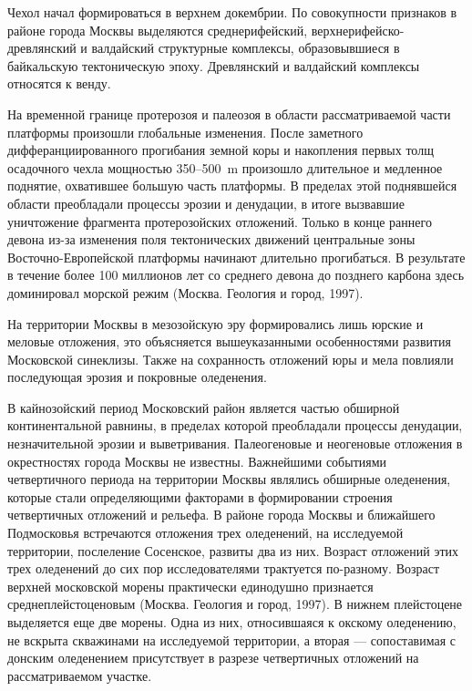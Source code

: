 Чехол начал формироваться в верхнем докембрии. По совокупности 
признаков в районе города Москвы выделяются среднерифейский, верхнерифейско-древлянский 
и валдайский структурные комплексы, образовывшиеся в байкальскую тектоническую эпоху. 
Древлянский и валдайский комплексы относятся к венду.

На временной границе протерозоя и палеозоя в области рассматриваемой части платформы 
произошли глобальные изменения. После заметного 
дифферанциированного прогибания земной коры и накопления первых толщ осадочного чехла
мощностью 350--500~\si{\meter} произошло длительное и медленное поднятие, охватившее
большую часть платформы. В пределах этой поднявшейся области преобладали процессы 
эрозии и денудации, в итоге вызвавшие уничтожение фрагмента протерозойских отложений. 
Только в конце раннего девона из-за изменения поля тектонических движений центральные 
зоны Восточно-Европейской платформы
начинают длительно прогибаться.
В результате в течение более 100 миллионов лет 
со среднего девона до позднего карбона здесь доминировал морской режим (Москва. Геология и город, 1997).

На территории Москвы в мезозойскую эру формировались лишь юрские и меловые отложения, это объясняется 
вышеуказанными особенностями развития Московской синеклизы. Также на сохранность 
отложений юры и мела повлияли последующая эрозия и покровные оледенения.

В кайнозойский период Московский район является частью обширной континентальной равнины,
в пределах которой преобладали процессы денудации, незначительной эрозии и выветривания.
Палеогеновые и неогеновые отложения в окрестностях города Москвы не известны.
Важнейшими событиями четвертичного периода на территории Москвы являлись обширные оледенения, 
которые стали определяющими факторами в формировании 
строения четвертичных отложений и рельефа.
В районе города Москвы и ближайшего Подмосковья встречаются отложения трех оледенений, 
на исследуемой территории,
послеление Сосенское, развиты два из них. 
Возраст отложений этих трех оледенений до сих пор исследователями трактуется по-разному.
Возраст верхней московской морены практически единодушно признается 
среднеплейстоценовым (Москва. Геология и город, 1997). 
В нижнем плейстоцене выделяется еще две морены.
Одна из них, относившаяся к окскому оледенению, не вскрыта скважинами на исследуемой территории, 
а вторая --- сопоставимая с донским оледенением присутствует в разрезе четвертичных отложений 
на рассматриваемом участке.

